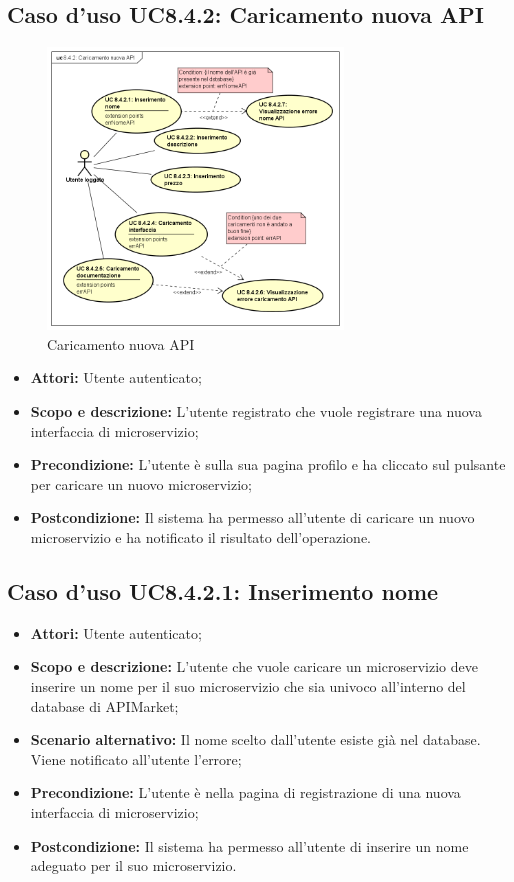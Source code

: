 \documentclass[12pt,a4paper,titlepage]{article}
\begin{document}
	\subsection{Caso d'uso UC8.4.2: Caricamento nuova API}
	\label{UC8.4.2}
	\begin{figure}[H]
		\centering
		\includegraphics[width=0.7\textwidth]{UseCase/CaricamentoNuovaAPI}
		\caption{Caricamento nuova API}
	\end{figure}
	\begin{itemize}
		\item \textbf{Attori: }Utente autenticato;
		\item \textbf{Scopo e descrizione: }L'utente registrato che vuole registrare una nuova interfaccia di microservizio;
		\item \textbf{Precondizione: }L'utente è sulla sua pagina profilo e ha cliccato sul pulsante per caricare un nuovo microservizio;
		\item \textbf{Postcondizione: }Il sistema ha permesso all'utente di caricare un nuovo microservizio e ha notificato il risultato dell'operazione.
	\end{itemize}
	\subsection{Caso d'uso UC8.4.2.1: Inserimento nome}
	\label{UC8.4.2.1}
	\begin{itemize}
		\item \textbf{Attori: }Utente autenticato;
		\item \textbf{Scopo e descrizione: }L'utente che vuole caricare un microservizio deve inserire un nome per il suo microservizio che sia univoco all'interno del database di APIMarket;
		\item \textbf{Scenario alternativo: }Il nome scelto dall'utente esiste già nel database. Viene notificato all'utente l'errore;
		\item \textbf{Precondizione: }L'utente è nella pagina di registrazione di una nuova interfaccia di microservizio;
		\item \textbf{Postcondizione: }Il sistema ha permesso all'utente di inserire un nome adeguato per il suo microservizio.
	\end{itemize}
\end{document}
